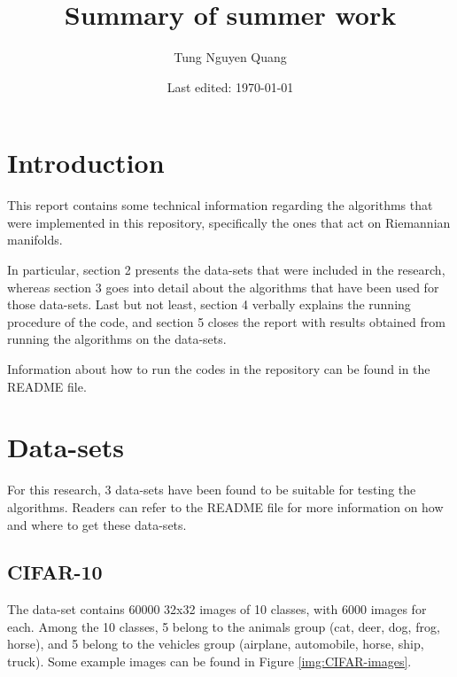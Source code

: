 \documentclass[12pt]{article}
\title{Summary of summer work}
\author{Tung Nguyen Quang}
\date{Last edited: \today}
\begin{document}
\maketitle
\begin{sloppypar}

\section{Introduction}
This report contains some technical information regarding the algorithms that were implemented in this repository, specifically the ones that act on Riemannian manifolds. 

\noindent
In particular, section 2 presents the data-sets that were included in the research, whereas section 3 goes into detail about the algorithms that have been used for those data-sets. Last but not least, section 4 verbally explains the running procedure of the code, and section 5 closes the report with results obtained from running the algorithms on the data-sets.

\noindent
Information about how to run the codes in the repository can be found in the README file.


\section{Data-sets}
For this research, 3 data-sets have been found to be suitable for testing the algorithms. Readers can refer to the README file for more information on how and where to get these data-sets.

\subsection{CIFAR-10}
The data-set contains 60000 32x32 images of 10 classes, with 6000 images for each. Among the 10 classes, 5 belong to the animals group (cat, deer, dog, frog, horse), and 5 belong to the vehicles group (airplane, automobile, horse, ship, truck). Some example images can be found in Figure \ref{img:CIFAR-images}.


\end{sloppypar}
\end{document}
